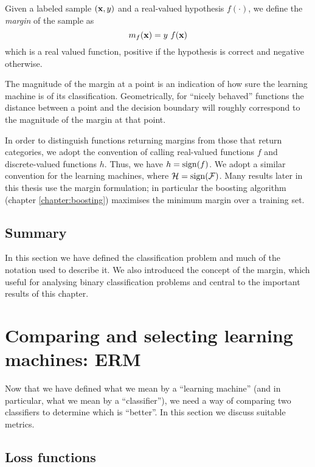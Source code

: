 \begin{definition}
Given a labeled sample $(\mathbf{x}, y)$ and a real-valued hypothesis
$f(\cdot)$, we define the \emph{margin} of the sample as
%
\begin{equation}
m_{f}(\mathbf{x}) = y\ f(\mathbf{x})
\end{equation}
%
which is a real valued function, positive if the hypothesis is correct
and negative otherwise.
\end{definition}

The magnitude of the margin at a point is an indication of how sure the
learning machine is of its classification.  Geometrically, for
``nicely behaved'' functions the distance between a point and the
decision boundary will roughly correspond to the magnitude of the
margin at that point.

In order to distinguish functions returning margins from those that
return categories, we adopt the convention of calling real-valued
functions $f$ and discrete-valued functions $h$.  Thus, we have $h =
\mathrm{sign}(f)$.  We adopt a similar convention for the learning machines,
where $\mathcal{H} = \mathrm{sign}(\mathcal{F})$.  Many results later in this thesis use
the margin formulation; in particular the boosting algorithm (chapter
\ref{chapter:boosting}) maximises the minimum margin over a training
set.


\subsection{Summary}

In this section we have defined the classification problem and much of
the notation used to describe it.  We also introduced the concept of
the margin, which useful for analysing binary classification
problems and central to the important results of this chapter.



\section{Comparing and selecting learning machines: ERM}
\label{sec:erm}

Now that we have defined what we mean by a ``learning machine'' (and
in particular, what we mean by a ``classifier''), we need a way of
comparing two classifiers to determine which is ``better''.  In this
section we discuss suitable metrics.


\subsection{Loss functions}
\label{sec:loss function}

